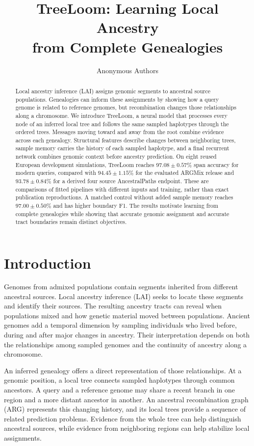 \documentclass[letterpaper]{article}
\title{TreeLoom: Learning Local Ancestry\\from Complete Genealogies}
\author{Anonymous Authors}
\begin{document}
\maketitle

\begin{abstract}
Local ancestry inference (LAI) assigns genomic segments to ancestral source populations. Genealogies can inform these assignments by showing how a query genome is related to reference genomes, but recombination changes those relationships along a chromosome. We introduce TreeLoom, a neural model that processes every node of an inferred local tree and follows the same sampled haplotypes through the ordered trees. Messages moving toward and away from the root combine evidence across each genealogy. Structural features describe changes between neighboring trees, sample memory carries the history of each sampled haplotype, and a final recurrent network combines genomic context before ancestry prediction. On eight reused European development simulations, TreeLoom reaches $97.08\pm0.57\%$ span accuracy for modern queries, compared with $94.45\pm1.15\%$ for the evaluated ARGMix release and $93.78\pm0.84\%$ for a derived four source AncestralPaths endpoint. These are comparisons of fitted pipelines with different inputs and training, rather than exact publication reproductions. A matched control without added sample memory reaches $97.00\pm0.50\%$ and has higher boundary F1. The results motivate learning from complete genealogies while showing that accurate genomic assignment and accurate tract boundaries remain distinct objectives.
\end{abstract}

\section{Introduction}
Genomes from admixed populations contain segments inherited from different ancestral sources. Local ancestry inference (LAI) seeks to locate these segments and identify their sources. The resulting ancestry tracts can reveal when populations mixed and how genetic material moved between populations. Ancient genomes add a temporal dimension by sampling individuals who lived before, during and after major changes in ancestry. Their interpretation depends on both the relationships among sampled genomes and the continuity of ancestry along a chromosome.

An inferred genealogy offers a direct representation of those relationships. At a genomic position, a local tree connects sampled haplotypes through common ancestors. A query and a reference genome may share a recent branch in one region and a more distant ancestor in another. An ancestral recombination graph (ARG) represents this changing history, and its local trees provide a sequence of related prediction problems. Evidence from the whole tree can help distinguish ancestral sources, while evidence from neighboring regions can help stabilize local assignments.
\end{document}
